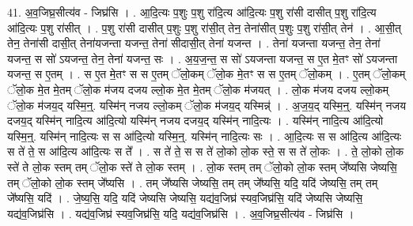 \documentclass[17pt]{extarticle}
\begin{document}
41. अ॒व॒जिघ्र॒सीत्य॑व - जिघ्र॑सि । . आ॒दि॒त्यः प॒शुः प॒शु रा॑दि॒त्य आ॑दि॒त्यः प॒शु रा॑सी दासीत् प॒शु रा॑दि॒त्य आ॑दि॒त्यः प॒शु रा॑सीत् । . प॒शु रा॑सी दासीत् प॒शुः प॒शु रा॑सी॒त् तेन॒ तेना॑सीत् प॒शुः प॒शु रा॑सी॒त् तेन॑ । . आ॒सी॒त् तेन॒ तेना॑सी दासी॒त् तेना॑यजन्ता यजन्त॒ तेना॑ सीदासी॒त् तेना॑ यजन्त । . तेना॑ यजन्ता यजन्त॒ तेन॒ तेना॑ यजन्त॒ स सो॑ ऽयजन्त॒ तेन॒ तेना॑ यजन्त॒ सः । . अ॒य॒ज॒न्त॒ स सो॑ ऽयजन्ता यजन्त॒ स ए॒त मे॒तꣳ सो॑ ऽयजन्ता यजन्त॒ स ए॒तम् । . स ए॒त मे॒तꣳ स स ए॒तम् ॅलो॒कम् ॅलो॒क मे॒तꣳ स स ए॒तम् ॅलो॒कम् । . ए॒तम् ॅलो॒कम् ॅलो॒क मे॒त मे॒तम् ॅलो॒क म॑जय दजय ल्लो॒क मे॒त मे॒तम् ॅलो॒क म॑जयत् । . लो॒क म॑जय दजय ल्लो॒कम् ॅलो॒क म॑जय॒द् यस्मि॒न्॒. यस्मि॑न् नजय ल्लो॒कम् ॅलो॒क म॑जय॒द् यस्मिन्न्॑ । . अ॒ज॒य॒द् यस्मि॒न्॒. यस्मि॑न् नजय दजय॒द् यस्मि॑न् नादि॒त्य आ॑दि॒त्यो यस्मि॑न् नजय दजय॒द् यस्मि॑न् नादि॒त्यः । . यस्मि॑न् नादि॒त्य आ॑दि॒त्यो यस्मि॒न्॒. यस्मि॑न् नादि॒त्यः स स आ॑दि॒त्यो यस्मि॒न्॒. यस्मि॑न् नादि॒त्यः सः । . आ॒दि॒त्यः स स आ॑दि॒त्य आ॑दि॒त्यः स ते॑ ते॒ स आ॑दि॒त्य आ॑दि॒त्यः स ते᳚ । . स ते॑ ते॒ स स ते॑ लो॒को लो॒क स्ते॒ स स ते॑ लो॒कः । . ते॒ लो॒को लो॒क स्ते॑ ते लो॒क स्तम् तम् ॅलो॒क स्ते॑ ते लो॒क स्तम् । . लो॒क स्तम् तम् ॅलो॒को लो॒क स्तम् जे᳚ष्यसि जेष्यसि॒ तम् ॅलो॒को लो॒क स्तम् जे᳚ष्यसि । . तम् जे᳚ष्यसि जेष्यसि॒ तम् तम् जे᳚ष्यसि॒ यदि॒ यदि॑ जेष्यसि॒ तम् तम् जे᳚ष्यसि॒ यदि॑ । . जे॒ष्य॒सि॒ यदि॒ यदि॑ जेष्यसि जेष्यसि॒ यद्य॑व॒जिघ्र॑ स्यव॒जिघ्र॑सि॒ यदि॑ जेष्यसि जेष्यसि॒ यद्य॑व॒जिघ्र॑सि । . यद्य॑व॒जिघ्र॑ स्यव॒जिघ्र॑सि॒ यदि॒ यद्य॑व॒जिघ्र॑सि । . अ॒व॒जिघ्र॒सीत्य॑व - जिघ्र॑सि । \newline
\pagebreak
\end{document}
